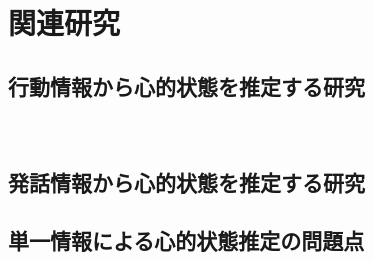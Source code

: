 \chapter{関連研究}
\section{行動情報から心的状態を推定する研究}
　

\section{発話情報から心的状態を推定する研究}


\section{単一情報による心的状態推定の問題点}

